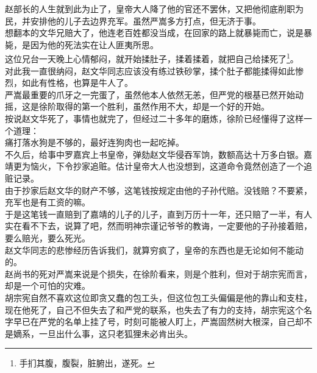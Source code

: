 \begin{multicols}{\theparacolNo}
赵部长的人生就到此为止了，皇帝大人降了他的官还不罢休，又把他彻底削职为民，并安排他的儿子去边界充军。虽然严嵩多方打点，但无济于事。\\

想翻本的文华兄赔大了，他连老百姓都没当成，在回家的路上就暴毙而亡，说是暴毙，是因为他的死法实在让人匪夷所思。\\

这位兄台一天晚上心情郁闷，就开始揉肚子，揉着揉着，就把自己给揉死了\footnote{手扪其腹，腹裂，脏腑出，遂死。}。\\

对此我一直很纳闷，赵文华同志应该没有练过铁砂掌，揉个肚子都能揉得如此惨烈，如此有性格，也算是牛人了。\\

严嵩最重要的爪牙之一完蛋了，虽然他本人依然无恙，但严党的根基已然开始动摇，这是徐阶取得的第一个胜利，虽然作用不大，却是一个好的开始。\\

按说赵文华死了，事情也就完了，但经过二十多年的磨炼，徐阶已经懂得了这样一个道理：\\

痛打落水狗是不够的，最好连狗肉也一起吃掉。\\

不久后，给事中罗嘉宾上书皇帝，弹劾赵文华侵吞军饷，数额高达十万多白银。嘉靖更为恼火，下令抄家追赃。估计皇帝大人也没想到，这道命令竟然创造了一个追赃记录。\\

由于抄家后赵文华的财产不够，这笔钱按规定由他的子孙代赔。没钱赔？不要紧，充军也是有工资的嘛。\\

于是这笔钱一直赔到了嘉靖的儿子的儿子，直到万历十一年，还只赔了一半，有人实在看不下去，说算了吧，然而明神宗谨记爷爷的教诲，一定要他的子孙接着赔，要么赔光，要么死光。\\

赵文华同志的悲惨经历告诉我们，就算穷疯了，皇帝的东西也是无论如何不能动的。\\

赵尚书的死对严嵩来说是个损失，在徐阶看来，则是个胜利，但对于胡宗宪而言，却是一个可怕的灾难。\\

胡宗宪自然不喜欢这位即贪又蠢的包工头，但这位包工头偏偏是他的靠山和支柱，现在他死了，自己不但失去了和严党的联系，也失去了有力的支持，胡宗宪这个名字早已在严党的名单上挂了号，时刻可能被人盯上，严嵩固然树大根深，自己却不是嫡系，一旦出什么事，这只老狐狸未必肯出头。\\


\end{multicols}
